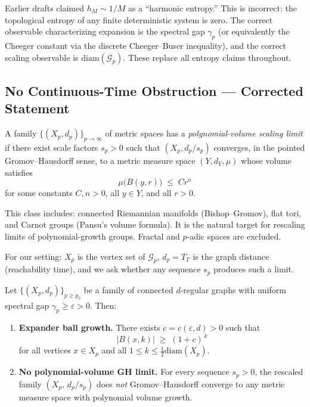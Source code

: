 \begin{remark}
  \label{rem:entropy}
  Earlier drafts claimed $h_M \sim 1/M$ as a ``harmonic entropy.''
  This is incorrect: the topological entropy of any finite deterministic system
  is zero.  The correct observable characterizing expansion is the spectral gap
  $\gamma_p$ (or equivalently the Cheeger constant via the discrete
  Cheeger--Buser inequality), and the correct scaling observable is
  $\mathrm{diam}(\mathcal{G}_p)$.  These replace all entropy claims throughout.
\end{remark}

\subsection{No Continuous-Time Obstruction --- Corrected Statement}
\label{sec:ncto}

\begin{definition}
  \label{def:pvol_limit}
  A family $\{(X_p, d_p)\}_{p \to \infty}$ of metric spaces has a
  \emph{polynomial-volume scaling limit} if there exist scale factors $s_p > 0$
  such that $(X_p, d_p/s_p)$ converges, in the pointed Gromov--Hausdorff sense,
  to a metric measure space $(Y, d_Y, \mu)$ whose volume satisfies
  \[
    \mu\bigl(B(y, r)\bigr) \;\leq\; C r^n
  \]
  for some constants $C, n > 0$, all $y \in Y$, and all $r > 0$.

  This class includes: connected Riemannian manifolds (Bishop--Gromov), flat tori,
  and Carnot groups (Pansu's volume formula).  It is the natural target for
  rescaling limits of polynomial-growth groups.  Fractal and $p$-adic spaces are
  excluded.

  For our setting: $X_p$ is the vertex set of $\mathcal{G}_p$,
  $d_p = T_\Gamma$ is the graph distance (reachability time),
  and we ask whether any sequence $s_p$ produces such a limit.
\end{definition}

\begin{lemma}
  \label{lem:growth_obs}
  Let $\{(X_p, d_p)\}_{p \geq p_0}$ be a family of connected $d$-regular graphs
  with uniform spectral gap $\gamma_p \geq \varepsilon > 0$.  Then:
  \begin{enumerate}
    \item[\emph{(i)}] \textbf{Expander ball growth.} There exists
      $c = c(\varepsilon, d) > 0$ such that
      \[
        |B(x, k)| \;\geq\; (1 + c)^{\,k}
      \]
      for all vertices $x \in X_p$ and all $1 \leq k \leq \tfrac{1}{2}\mathrm{diam}(X_p)$.
    \item[\emph{(ii)}] \textbf{No polynomial-volume GH limit.} For every sequence
      $s_p > 0$, the rescaled family $(X_p,\, d_p / s_p)$ does \emph{not}
      Gromov--Hausdorff converge to any metric measure space with polynomial
      volume growth.
  \end{enumerate}
\end{lemma}

